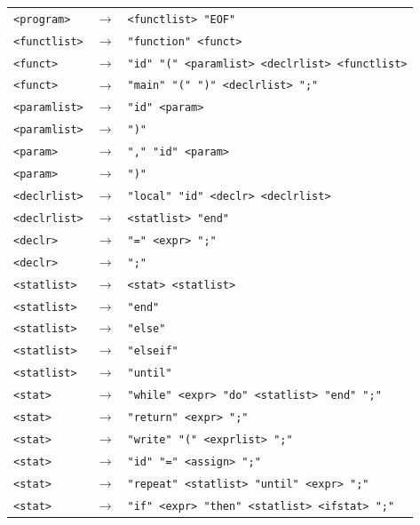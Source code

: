 \documentclass[12pt,a4paper,titlepage,final]{article}
\begin{document}
\begin{flushleft}
\begin{footnotesize}
\begin{tabular}{lll}
\label{synt}
\texttt{<program>}&$\rightarrow$&\texttt{<functlist> "EOF"}\\
\texttt{<functlist>}&$\rightarrow$&\texttt{"function"\ <funct>}\\
\texttt{<funct>}&$\rightarrow$&\texttt{"id"\ "("\ <paramlist>\ <declrlist>\ <functlist>}\\
\texttt{<funct>}&$\rightarrow$&\texttt{"main"\ "("\ ")"\ <declrlist>\ ";"}\\
\texttt{<paramlist>}&$\rightarrow$&\texttt{"id"\ <param>}\\
\texttt{<paramlist>}&$\rightarrow$&\texttt{")"}\\
\texttt{<param>}&$\rightarrow$&\texttt{","\ "id"\ <param>}\\
\texttt{<param>}&$\rightarrow$&\texttt{")"}\\
\texttt{<declrlist>}&$\rightarrow$&\texttt{"local"\ "id"\ <declr>\ <declrlist>}\\
\texttt{<declrlist>}&$\rightarrow$&\texttt{<statlist>\ "end"}\\
\texttt{<declr>}&$\rightarrow$&\texttt{"}\texttt{=}\texttt{"\ <expr>\ ";"}\\
\texttt{<declr>}&$\rightarrow$&\texttt{";"}\\
\texttt{<statlist>}&$\rightarrow$&\texttt{<stat>\ <statlist>}\\
\texttt{<statlist>}&$\rightarrow$&\texttt{"end"}\\
\texttt{<statlist>}&$\rightarrow$&\texttt{"else"}\\
\texttt{<statlist>}&$\rightarrow$&\texttt{"elseif"}\\
\texttt{<statlist>}&$\rightarrow$&\texttt{"until"}\\
\texttt{<stat>}&$\rightarrow$&\texttt{"while"\ <expr>\ "do"\ <statlist>\ "end"\ ";"}\\
\texttt{<stat>}&$\rightarrow$&\texttt{"return"\ <expr>\ ";"}\\
\texttt{<stat>}&$\rightarrow$&\texttt{"write"\ "("\ <exprlist>\ ";"}\\
\texttt{<stat>}&$\rightarrow$&\texttt{"id"\ "}\texttt{=}\texttt{"\ <assign>\ ";"}\\
\texttt{<stat>}&$\rightarrow$&\texttt{"repeat"\ <statlist>\ "until"\ <expr>\ ";"}\\
\texttt{<stat>}&$\rightarrow$&\texttt{"if"\ <expr>\ "then"\ <statlist>\ <ifstat>\ ";"}\\

\end{tabular}
\end{footnotesize}
\end{flushleft}
\end{document}
